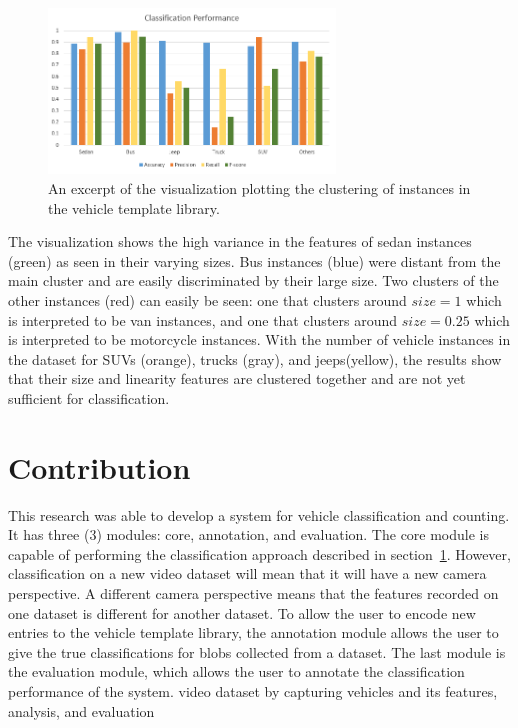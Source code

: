 \documentclass[conference]{IEEEtran}
\begin{document}
\begin{figure}[!ht]
\centering
\includegraphics[width=3in]{classification_performance.png}
\caption{An excerpt of the visualization plotting the clustering of instances in the vehicle template library. }
\label{fig_template_visualization}
\end{figure}

The visualization shows the high variance in the features of sedan instances (green) as seen in their varying sizes. Bus instances (blue) were distant from the main cluster and are easily discriminated by their large size. Two clusters of the other instances (red) can easily be seen: one that clusters around $size = 1$ which is interpreted to be van instances, and one that clusters around $size = 0.25$ which is interpreted to be motorcycle instances. With the number of vehicle instances in the dataset for SUVs (orange), trucks (gray), and jeeps(yellow), the results show that their size and linearity features are clustered together and are not yet sufficient for classification.

\section{Contribution}

This research was able to develop a system for vehicle classification and counting. It has three (3) modules: core, annotation, and evaluation. The core module is capable of performing the classification approach described in section~\ref{}. However, classification on a new video dataset will mean that it will have a new camera perspective. A different camera perspective means that the features recorded on one dataset is different for another dataset. To allow the user to encode new entries to the vehicle template library, the annotation module allows the user to give the true classifications for blobs collected from a dataset. The last module is the evaluation module, which allows the user to annotate the classification performance of the system.  video dataset by capturing vehicles and its features, analysis, and evaluation
\end{document}
